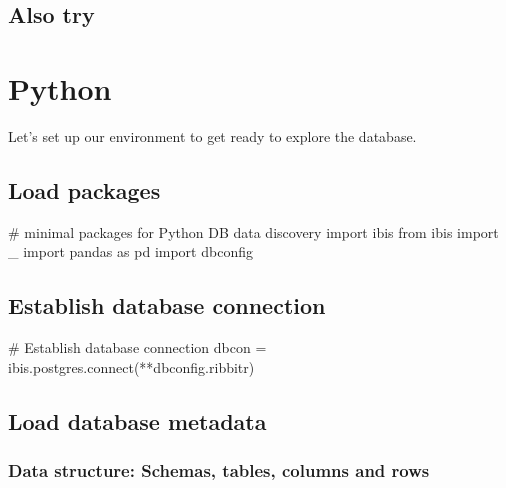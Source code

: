 \documentclass[
  letterpaper,
  DIV=11,
  numbers=noendperiod]{scrartcl}
\newenvironment{Shaded}{\begin{snugshade}}{\end{snugshade}}
\newcommand{\CommentTok}[1]{\textcolor[rgb]{0.37,0.37,0.37}{#1}}
\newcommand{\ExtensionTok}[1]{\textcolor[rgb]{0.00,0.23,0.31}{#1}}
\newcommand{\ImportTok}[1]{\textcolor[rgb]{0.00,0.46,0.62}{#1}}
\newcommand{\NormalTok}[1]{\textcolor[rgb]{0.00,0.23,0.31}{#1}}
\newcommand{\OperatorTok}[1]{\textcolor[rgb]{0.37,0.37,0.37}{#1}}
\begin{document}
\subsection{Also try}\label{also-try}

\section{Python}

Let's set up our environment to get ready to explore the database.

\subsection{Load packages}\label{load-packages-1}

\begin{Shaded}
\begin{Highlighting}[]
\CommentTok{\# minimal packages for Python DB data discovery}
\ImportTok{import}\NormalTok{ ibis}
\ImportTok{from}\NormalTok{ ibis }\ImportTok{import}\NormalTok{ \_}
\ImportTok{import}\NormalTok{ pandas }\ImportTok{as}\NormalTok{ pd}
\ImportTok{import}\NormalTok{ dbconfig}
\end{Highlighting}
\end{Shaded}

\subsection{Establish database
connection}\label{establish-database-connection-1}

\begin{Shaded}
\begin{Highlighting}[]
\CommentTok{\# Establish database connection}
\NormalTok{dbcon }\OperatorTok{=}\NormalTok{ ibis.postgres.}\ExtensionTok{connect}\NormalTok{(}\OperatorTok{**}\NormalTok{dbconfig.ribbitr)}
\end{Highlighting}
\end{Shaded}

\subsection{Load database metadata}\label{load-database-metadata-1}

\subsubsection{Data structure: Schemas, tables, columns and
rows}\label{data-structure-schemas-tables-columns-and-rows-1}
\end{document}
